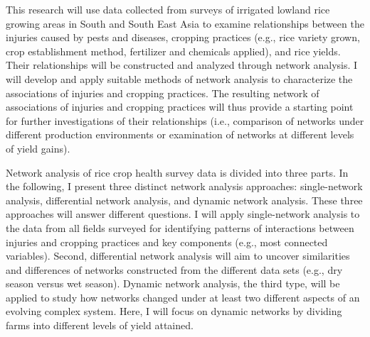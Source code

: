 ﻿%



This research will use data collected from surveys of irrigated lowland rice growing areas in South and South East Asia to examine relationships between the injuries caused by pests and diseases, cropping practices (e.g., rice variety grown, crop establishment method, fertilizer and chemicals applied), and rice yields. Their relationships will be constructed and analyzed through network analysis. I will develop and apply suitable methods of network analysis to characterize the associations of injuries and cropping practices. The resulting network of associations of injuries and cropping practices will thus provide a starting point for further investigations of their relationships (i.e., comparison of networks under different production environments or examination of networks at different levels of yield gains). 

Network analysis of rice crop health survey data is divided into three parts. In the following, I present three distinct network analysis approaches: single-network analysis, differential network analysis, and dynamic network analysis. These three approaches will answer different questions. I will apply single-network analysis to the data from all fields surveyed for identifying patterns of interactions between injuries and cropping practices and key components (e.g., most connected variables). Second, differential network analysis will aim to uncover similarities and differences of networks constructed from the different data sets (e.g., dry season versus wet season). Dynamic network analysis, the third type, will be applied to study how networks changed under at least two different aspects of an evolving complex system. Here, I will focus on dynamic networks by dividing farms into different levels of yield attained. 

